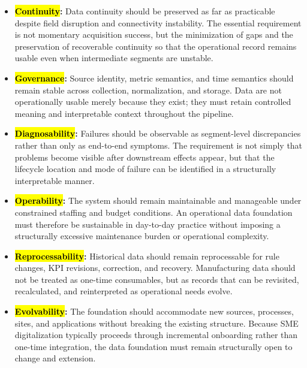 \documentclass[systems,article,accept,pdftex,moreauthors]{Definitions/mdpi}
\begin{document}
\begin{itemize}
    \item[\textbf{\hl{R1.}}] \textbf{\hl{Continuity}:} %
    Data continuity should be preserved as far as practicable despite field disruption and connectivity instability. The essential requirement is not momentary acquisition success, but the minimization of gaps and the preservation of recoverable continuity so that the operational record remains usable even when intermediate segments are unstable.

    \item[\textbf{\hl{R2.}}] \textbf{\hl{Governance}:} Source identity, metric semantics, and time semantics should remain stable across collection, normalization, and storage. Data are not operationally usable merely because they exist; they must retain controlled meaning and interpretable context throughout the pipeline.

    \item[\textbf{\hl{R3.}}] \textbf{\hl{Diagnosability}:} Failures should be observable as segment-level discrepancies rather than only as end-to-end symptoms. The requirement is not simply that problems become visible after downstream effects appear, but that the lifecycle location and mode of failure can be identified in a structurally interpretable manner.

    \item[\textbf{\hl{R4.}}] \textbf{\hl{Operability}:} The system should remain maintainable and manageable under constrained staffing and budget conditions. An operational data foundation must therefore be sustainable in day-to-day practice without imposing a structurally excessive maintenance burden or operational complexity.

    \item[\textbf{\hl{R5.}}] \textbf{\hl{Reprocessability}:} Historical data should remain reprocessable for rule changes, KPI revisions, correction, and recovery. Manufacturing data should not be treated as one-time consumables, but as records that can be revisited, recalculated, and reinterpreted as operational needs evolve.

    \item[\textbf{\hl{R6.}}] \textbf{\hl{Evolvability}:} The foundation should accommodate new sources, processes, sites, and applications without breaking the existing structure. Because SME digitalization typically proceeds through incremental onboarding rather than one-time integration, the data foundation must remain structurally open to change and extension.
\end{itemize}
\end{document}
